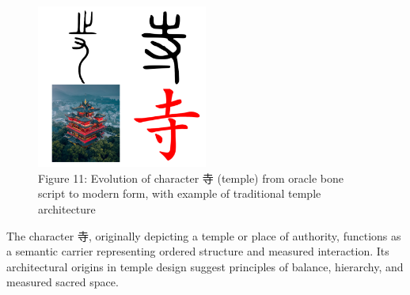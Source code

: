 \documentclass[
  11pt,
  letterpaper,
]{article}
\begin{document}
\begin{figure}
\centering
\includegraphics[width=0.5\textwidth]{./images/zi_temple.png}
\caption{Figure 11: Evolution of character 寺 (temple) from oracle bone
script to modern form, with example of traditional temple architecture}
\end{figure}



The character 寺, originally depicting a temple or place of authority,
functions as a semantic carrier representing ordered structure and
measured interaction. Its architectural origins in temple design suggest
principles of balance, hierarchy, and measured sacred space.
\end{document}
